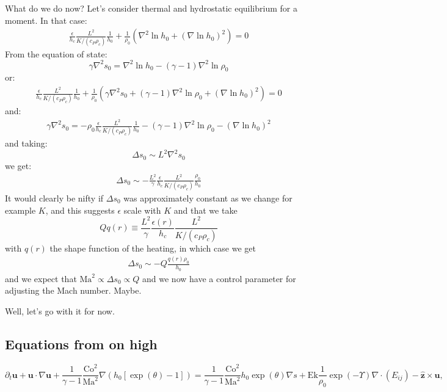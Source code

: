 \documentclass{aastex631}
\newcommand{\del}{\nabla}
\renewcommand{\vec}{\boldsymbol}
\begin{document}
What do we do now?  Let's consider thermal and hydrostatic equilibrium for a moment.  In that case:
\begin{align}
\frac{\epsilon}{h_c} \frac{L^2}{K/(c_P \rho_c)}\frac{1}{h_0} +  \frac{1}{\rho_0} \left(\nabla^2 \ln h_0 + (\nabla \ln h_0)^2 \right) = 0
\end{align}
From the equation of state:
\begin{equation}
  \gamma \nabla^2 s_0 = \nabla^2 \ln h_0 - (\gamma-1)\nabla^2 \ln \rho_0
\end{equation}
or:
\begin{align}
\frac{\epsilon}{h_c} \frac{L^2}{K/(c_P \rho_c)}\frac{1}{h_0} +  \frac{1}{\rho_0} \left(\gamma \nabla^2 s_0 + (\gamma-1)\nabla^2 \ln \rho_0 + (\nabla \ln h_0)^2 \right) = 0
\end{align}
and:
\begin{align}
 \gamma \nabla^2 s_0 = - \rho_0 \frac{\epsilon}{h_c} \frac{L^2}{K/(c_P \rho_c)}\frac{1}{h_0} - (\gamma-1)\nabla^2 \ln \rho_0 - (\nabla \ln h_0)^2
\end{align}
and taking:
\begin{equation}
  \Delta s_0 \sim L^2 \nabla^2 s_0
\end{equation}
we get:
\begin{align}
 \Delta s_0 \sim - \frac{L^2}{\gamma} \frac{\epsilon}{h_c} \frac{L^2}{K/(c_P \rho_c)}\frac{\rho_0}{h_0}
\end{align}
It would clearly be nifty if $\Delta s_0$ was approximately constant as we change for example $K$, and this suggests $\epsilon$ scale with $K$ and that we take
\begin{equation}
Q q(r)\equiv \frac{L^2}{\gamma} \frac{\epsilon(r)}{h_c} \frac{L^2}{K/(c_P \rho_c)}
\end{equation}
with $q(r)$ the shape function of the heating,
in which case we get
\begin{align}
 \Delta s_0 \sim - Q\frac{q(r) \rho_0}{h_0}
\end{align}
and we expect that $\mathrm{Ma}^2 \propto \Delta s_0 \propto Q$ and we now have a control parameter for adjusting the Mach number.  Maybe.

Well, let's go with it for now.

\subsection{Equations from on high}

\begin{equation}
  \partial_t \vec{u} + \vec{u}\cdot \del \vec{u} + \frac{1}{\gamma-1}\frac{\mathrm{Co}^2}{\mathrm{Ma}^{2}}\del (h_0[\exp(\theta)-1]) =
  \frac{1}{\gamma-1}\frac{\mathrm{Co}^2}{\mathrm{Ma}^{2}} h_0\exp(\theta)\del s
  + \mathrm{Ek}\frac{1}{\rho_0}\exp(-\Upsilon)\del\cdot (E_{ij}) - \vec{\hat{z}} \times \vec{u},
\end{equation}
\end{document}
